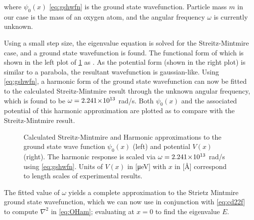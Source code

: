 where $\psi_0(x)$ \cref{eq:gshwfn} is the ground state wavefunction. Particle mass $m$ in our case is the mass of an oxygen atom, and the angular frequency $\omega$ is currently unknown.

Using a small step size, the eigenvalue equation is solved for the Streitz-Mintmire case, and a ground state wavefunction is found.
The functional form of which is shown in the left plot of \cref{fig:smvh} as .
As the potential form (shown in the right plot) is similar to a parabola, the resultant wavefunction is gaussian-like.
Using \cref{eq:gshwfn}, a harmonic form of the ground state wavefunction can now be fitted to the calculated Streitz-Mintmire result through the unknown angular frequency, which is found to be $\omega = 2.241\!\times\!10^{13}$ rad/s.
Both $\psi_0(x)$ and the associated potential of this harmonic approximation are plotted as  to compare with the Streitz-Mintmire result.
\begin{figure}[htp]
\centering
\resizebox{\widefigure}{!}{}
\parbox{\widefigure}{\caption[Harmonic Approximation to Strietz Mintmire]{\label{fig:smvh}Calculated Streitz-Mintmire  and Harmonic approximations  to the ground state wave function $\psi_0(x)$ (left) and potential $V(x)$ (right). The harmonic response is scaled via $\omega = 2.241\!\times\!10^{13}$ rad/s using \cref{eq:gshwfn}. Units of $V(x)$ in [μeV] with $x$ in [Å] correspond to length scales of experimental results.}}
\end{figure}

The fitted value of $\omega$ yields a complete approximation to the Strietz Mintmire ground state wavefunction, which we can now use in conjunction with \cref{eq:cd22f} to compute $\nabla^2$ in \cref{eq:OHam}; evaluating at $x = 0$ to find the eigenvalue $E$.

